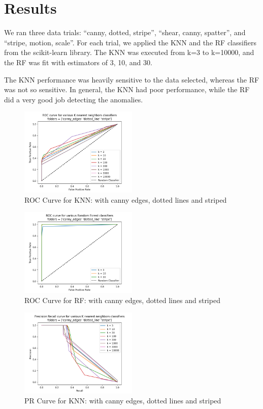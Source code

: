 \section{Results}
We ran three data trials: “canny, dotted, stripe”, “shear, canny, spatter”, and “stripe, motion, scale”. For each trial, we applied the KNN and the RF classifiers from the scikit-learn library. The KNN was executed from k=3 to k=10000, and the RF was fit with estimators of 3, 10, and 30.

The KNN performance was heavily sensitive to the data selected, whereas the RF was not so sensitive. In general, the KNN had poor performance, while the RF did a very good job detecting the anomalies.

\begin{figure}[htbp]
    \centerline{\includegraphics[width=0.5\textwidth]{resources/roc_curve_knn_canny_edges_dotted_line_stripe.png}}    
    \caption{ROC Curve for KNN: with canny edges, dotted lines and striped}\label{fig9}
\end{figure}

\begin{figure}[htbp]
    \centerline{\includegraphics[width=0.5\textwidth]{resources/roc_curve_rf_canny_edges_dotted_line_stripe.png}}    
    \caption{ROC Curve for RF: with canny edges, dotted lines and striped}\label{fig10}
\end{figure}

\begin{figure}[htbp]
    \centerline{\includegraphics[width=0.5\textwidth]{resources/precision_recall_knn_canny_edges_dotted_line_stripe.png}}    
    \caption{PR Curve for KNN: with canny edges, dotted lines and striped}\label{fig11}
\end{figure}

